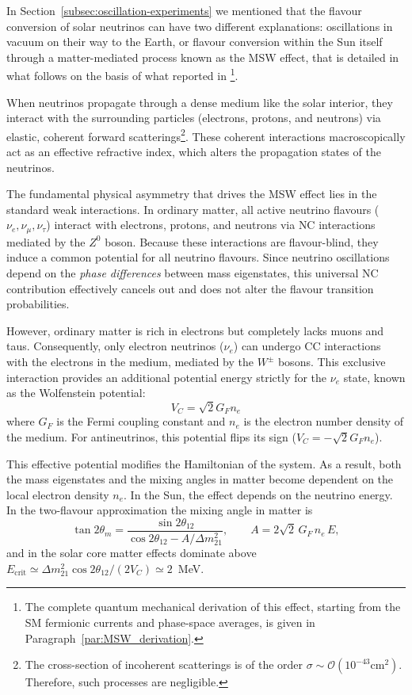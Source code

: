 In Section~\ref{subsec:oscillation-experiments} we mentioned that the flavour conversion of solar neutrinos can have two different explanations: oscillations in vacuum on their way to the Earth, or flavour conversion within the Sun itself through a matter-mediated process known as the \ac{MSW} effect, that is detailed in what follows on the basis of what reported in \cite{neutrinosPDG}\footnote{The complete quantum mechanical derivation of this effect, starting from the \ac{SM} fermionic currents and phase-space averages, is given in Paragraph~\ref{par:MSW_derivation}.}.

When neutrinos propagate through a dense medium like the solar interior, they interact with the surrounding particles (electrons, protons, and neutrons) via elastic, coherent forward scatterings\footnote{The cross-section of incoherent scatterings is of the order $\sigma \sim \mathcal{O}(10^{-43}\text{cm}^2)$. Therefore, such processes are negligible.}. These coherent interactions macroscopically act as an effective refractive index, which alters the propagation states of the neutrinos.

The fundamental physical asymmetry that drives the \ac{MSW} effect lies in the standard weak interactions. In ordinary matter, all active neutrino flavours ($\nu_e, \nu_\mu, \nu_\tau$) interact with electrons, protons, and neutrons via \ac{NC} interactions mediated by the $Z^0$ boson. Because these interactions are flavour-blind, they induce a common potential for all neutrino flavours. Since neutrino oscillations depend on the \textit{phase differences} between mass eigenstates, this universal \ac{NC} contribution effectively cancels out and does not alter the flavour transition probabilities.

However, ordinary matter is rich in electrons but completely lacks muons and taus. Consequently, only electron neutrinos ($\nu_e$) can undergo \ac{CC} interactions with the electrons in the medium, mediated by the $W^\pm$ bosons. This exclusive interaction provides an additional potential energy strictly for the $\nu_e$ state, known as the Wolfenstein potential:
\begin{equation}
    V_C = \sqrt{2} G_F n_e
\end{equation}
where $G_F$ is the Fermi coupling constant and $n_e$ is the electron number density of the medium. For antineutrinos, this potential flips its sign ($V_C = -\sqrt{2} G_F n_e$).

This effective potential modifies the Hamiltonian of the system. As a result, both the mass eigenstates and the mixing angles in matter become dependent on the local electron density $n_e$. In the Sun, the effect depends on the neutrino energy. In the two-flavour approximation the mixing angle in matter is
\begin{equation}
    \label{eq:matter-angle}
    \tan 2\theta_m = \frac{\sin 2\theta_{12}}{\cos 2\theta_{12} - A/\Delta m^2_{21}},
    \qquad A = 2\sqrt{2}\, G_F\, n_e\, E,
\end{equation}
and in the solar core matter effects dominate above $E_\text{crit} \simeq \Delta m^2_{21}\cos 2\theta_{12}/(2V_C) \simeq 2$~MeV.

